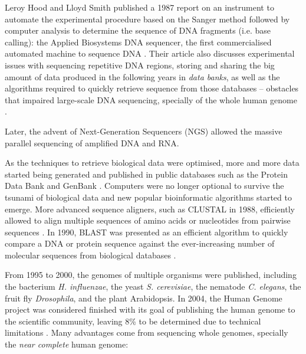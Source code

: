 Leroy Hood and Lloyd Smith published a 1987 report on an instrument to automate the experimental procedure based on the Sanger method followed by computer analysis to determine the sequence of DNA fragments (i.e. base calling): the Applied Biosystems DNA sequencer, the first commercialised automated machine to sequence DNA \cite{hood:1987va}. Their article also discusses experimental issues with sequencing repetitive DNA regions, storing and sharing the big amount of data produced in the following years in \emph{data banks}, as well as the algorithms required to quickly retrieve sequence from those databases -- obstacles that impaired large-scale DNA sequencing, specially of the whole human genome \cite{hood:1987va}.

Later, the advent of Next-Generation Sequencers (NGS) allowed the massive parallel sequencing of amplified DNA and RNA.

As the techniques to retrieve biological data were optimised, more and more data started being generated and published in public databases such as the Protein Data Bank \cite{protein-data-bank:1971tm} and GenBank \cite{burks:1985ts}. Computers were no longer optional to survive the tsunami of biological data and new popular bioinformatic algorithms started to emerge. More advanced sequence aligners, such as CLUSTAL in 1988, efficiently allowed to align multiple sequences of amino acids or nucleotides from pairwise sequences \cite{higgins:1988ul}. In 1990, BLAST was presented as an efficient algorithm to quickly compare a DNA or protein sequence against the ever-increasing number of molecular sequences from biological databases \cite{altschul:1990vt}.

From 1995 to 2000, the genomes of multiple organisms were published, including the bacterium \emph{H. influenzae}, the yeast \emph{S. cerevisiae}, the nematode \emph{C. elegans}, the fruit fly \emph{Drosophila}, and the plant Arabidopsis. In 2004, the Human Genome project was considered finished with its goal of publishing the human genome to the scientific community, leaving 8\% to be determined due to technical limitations \cite{consortium:2004wi,nurk:2021up}. Many advantages come from sequencing whole genomes, specially the \emph{near complete} human genome:


